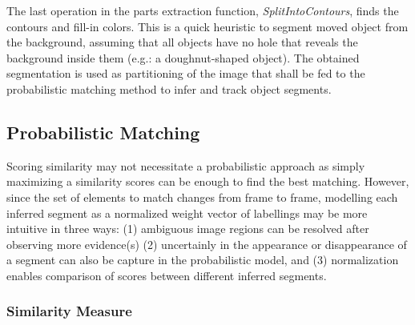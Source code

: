 \documentclass{article}
\begin{document}
The last operation in the parts extraction function, \emph{SplitIntoContours}, finds the contours and fill-in colors. This is a quick heuristic to segment moved object from the background, assuming that all objects have no hole that reveals the background inside them (e.g.: a doughnut-shaped object). The obtained segmentation is used as partitioning of the image that shall be fed to the probabilistic matching method to infer and track object segments. 

\subsection{Probabilistic Matching}

Scoring similarity may not necessitate a probabilistic approach as simply maximizing a similarity scores can be enough to find the best matching. However, since the set of elements to match changes from frame to frame, modelling each inferred segment as a normalized weight vector of labellings may be more intuitive in three ways: (1) ambiguous image regions can be resolved after observing more evidence(s) (2) uncertainly in the appearance or disappearance of a segment can also be capture in the probabilistic model, and (3) normalization enables comparison of scores between different inferred segments. 

\subsubsection{Similarity Measure}
\end{document}
